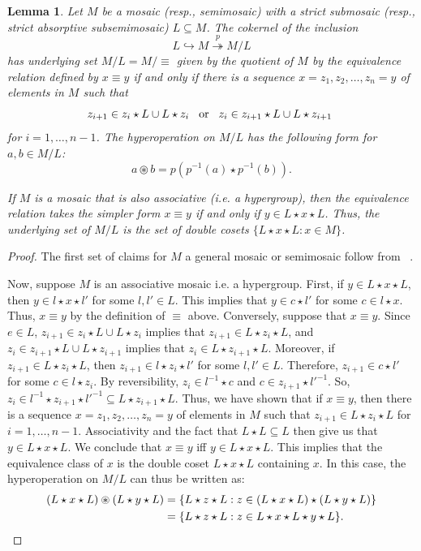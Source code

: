 \documentclass[reqno]{amsart}
\newcommand{\ostar}{\circledast}
\numberwithin{equation}{section}
\theoremstyle{plain}
\newtheorem{lemma}[equation]{Lemma}
\theoremstyle{definition}
\begin{document}
\begin{lemma}\label{lem:cokernel}
Let $M$ be a mosaic (resp., semimosaic) with a strict submosaic (resp., strict absorptive subsemimosaic) $L \subseteq M$. The cokernel of the inclusion
\[
L \hookrightarrow M \overset{p}{\twoheadrightarrow} M/L
\]
has underlying set $M/L = M/\!\!\equiv$ given by the quotient of $M$ by the equivalence relation defined by $x \equiv y$ if and only if there is a sequence $x = z_1, z_2, \dots, z_n = y$ of elements in $M$ such that 
\[
  z_{i+1} \in z_i \star L \cup L\star z_i \hspace{3mm} \text{or} \hspace{3mm} z_{i} \in z_{i+1} \star L \cup L\star z_{i+1} \hspace{1mm}
\]
for $i = 1, \dots, n-1$. The hyperoperation on $M/L$ has the following form for $a,b \in M/L$: 
\[
a \ostar b = p(p^{-1}(a)\star p^{-1}(b)).
\]

If $M$ is a mosaic that is also associative (i.e. a hypergroup), then the equivalence relation takes the simpler form $x\equiv y$ if and only if $y\in L\star x\star L$. Thus, the underlying set of $M/L$ is the set of double cosets $\{L\star x\star L : x\in M\}$.
\end{lemma}

\begin{proof}
The first set of claims for $M$ a general mosaic or semimosaic follow from ~\cite[Corollary~4.2, Lemma~3.10]{NakamuraReyes}. 

Now, suppose $M$ is an associative mosaic i.e. a hypergroup. First, if $y\in L\star x\star L$, then $y\in l\star x\star l'$ for some $l, l' \in L$. This implies that $y\in c \star l'$ for some $c\in l\star x$. Thus, $x\equiv y$ by the definition of $\equiv$ above. Conversely, suppose that $x\equiv y$. Since $e\in L$, $z_{i+1} \in z_i \star L \cup L\star z_i$ implies that $z_{i+1} \in L\star z_i\star L$, and $z_{i} \in z_{i+1} \star L \cup L\star z_{i+1}$ implies that $z_i \in L \star z_{i+1} \star L$. Moreover, if $z_{i+1} \in L\star z_i \star L$, then $z_{i+1} \in l\star z_i \star l'$ for some $l, l' \in L$. Therefore, $z_{i+1} \in c \star l'$ for some $c\in l \star z_i$. By reversibility, $z_i \in l^{-1} \star c$ and $c\in z_{i+1} \star l'^{-1}$. So, $z_i \in l^{-1} \star z_{i+1} \star l'^{-1} \subseteq L\star z_{i+1} \star L$. Thus, we have shown that if $x\equiv y$, then there is a sequence $x = z_1, z_2, \dots, z_n = y$ of elements in $M$ such that $ z_{i+1} \in L\star z_i \star L$ for $i = 1, \dots, n-1$. Associativity and the fact that $L\star L\subseteq L$ then give us that $y\in L\star x\star L$. We conclude that $x\equiv y$ iff $y\in L\star x\star L$. This implies that the equivalence class of $x$ is the double coset $L\star x \star L$ containing $x$.
In this case, the hyperoperation on $M/L$ can thus be written as:
\begin{align*}
    (L\star x\star L) \ostar (L\star y \star L) &= \{L\star z \star L : z\in (L\star x\star L) \star (L\star y \star L)\} \\
    &= \{L\star z \star L : z\in L\star x\star L\star y \star L\}. \qedhere
\end{align*}
\end{proof}
\end{document}

